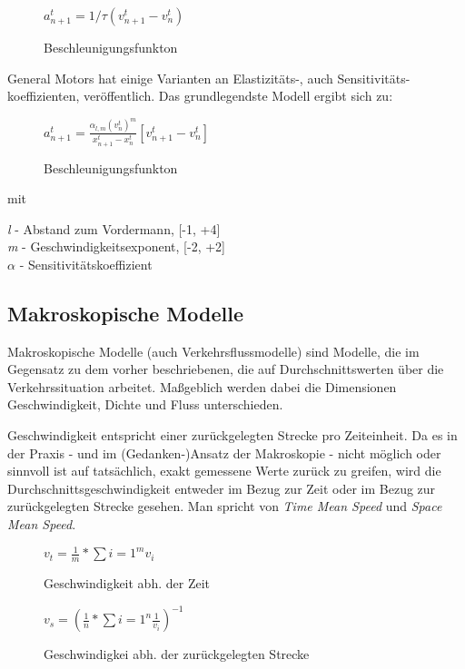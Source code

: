 \begin{figure}[H]
    \centering
    \( a^t_{n+1} = 1/\tau ({v^t_{n+1}} - v^t_n) \)
    \caption{Beschleunigungsfunkton}
    \label{fig:acceleration_function}
\end{figure}

General Motors hat einige Varianten an Elastizitäts-, auch Sensitivitäts-koeffizienten, veröffentlich. Das grundlegendste Modell ergibt sich zu:

\begin{figure}[H]
    \centering
    \(
    a^t_{n+1} = \frac{\alpha_{l,m}(v^t_n)^m}{x^t_{n+1} - x^t_n} [v^t_{n+1} - v^t_n]
    \)
    \caption{Beschleunigungsfunkton}
    \label{fig:acceleration_function}
\end{figure}

mit

\textit{l} - Abstand zum Vordermann, [-1, +4] \\
\textit{m} - Geschwindigkeitsexponent, [-2, +2] \\
\textit{\( \alpha \)} - Sensitivitätskoeffizient

\subsection{Makroskopische Modelle}

Makroskopische Modelle (auch Verkehrsflussmodelle) sind Modelle, die im Gegensatz zu dem vorher beschriebenen, die auf Durchschnittswerten über die Verkehrssituation arbeitet. Maßgeblich werden dabei die Dimensionen Geschwindigkeit, Dichte und Fluss unterschieden.

Geschwindigkeit entspricht einer zurückgelegten Strecke pro Zeiteinheit. Da es in der Praxis - und im (Gedanken-)Ansatz der Makroskopie - nicht möglich oder sinnvoll ist auf tatsächlich, exakt gemessene Werte zurück zu greifen, wird die Durchschnittsgeschwindigkeit entweder im Bezug zur Zeit oder im Bezug zur zurückgelegten Strecke gesehen. Man spricht von \textit{Time Mean Speed} und \textit{Space Mean Speed}.

\begin{multicols}{2}
\begin{figure}[H]
    \centering
\( v_t = \frac{1}{m} * \sum{i=1}^m v_i \)
    \caption{Geschwindigkeit abh. der Zeit}
    \label{func:makro_speed_time_function}
\end{figure}

\begin{figure}[H]
\( v_s = (\frac{1}{n} * \sum{i=1}^n \frac{1}{v_i})^{-1} \)
    \caption{Geschwindigkei abh. der zurückgelegten Strecke}
    \label{func:makro_speed_time_function}
\end{figure}
\end{multicols}

